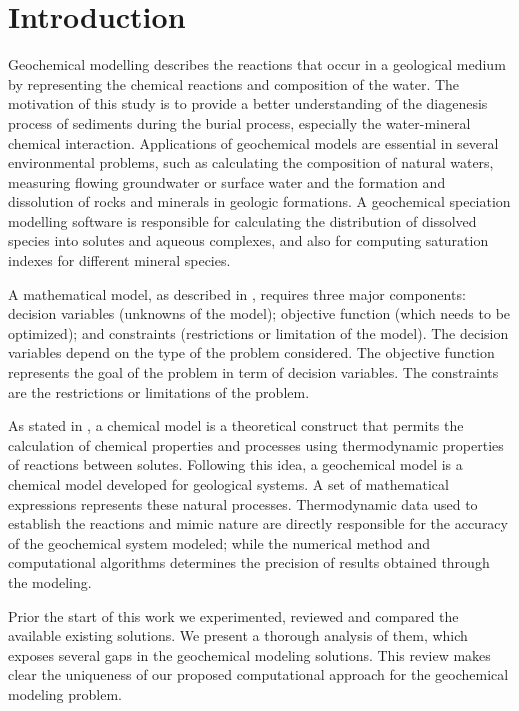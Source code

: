 \chapter{Introduction} 
\label{chapter:intro}


Geochemical modelling describes the reactions that occur in a geological medium by representing the chemical reactions and composition of the water. The motivation of this study is to provide a better understanding of the diagenesis process of sediments during the burial process, especially the water-mineral chemical interaction. Applications of geochemical models are essential in several environmental problems, such as calculating the composition of natural waters, measuring flowing groundwater or surface water and the formation and dissolution of rocks and minerals in geologic formations. A geochemical speciation modelling software is responsible for calculating the distribution of dissolved species into solutes and aqueous complexes, and also for computing saturation indexes for different mineral species. 


A mathematical model, as described in \cite{Sarker:08}, requires three major components: decision variables (unknowns of the model); objective function (which needs to be optimized); and constraints (restrictions or limitation of the model). 
The decision variables depend on the type of the problem considered.  The objective function represents the goal of the problem in term of decision variables. The constraints are the restrictions or limitations of the problem.

As stated in \cite{Drever:05}, a chemical model is a theoretical construct that permits the calculation of chemical properties and processes using thermodynamic properties of reactions between solutes. Following this idea, a geochemical model is a chemical model developed for geological systems. A set of mathematical expressions represents these natural processes. Thermodynamic data used to establish the reactions and mimic nature are directly responsible for the accuracy of the geochemical system modeled; while the numerical method and computational algorithms determines the precision of results obtained through the modeling.


Prior the start of this work we experimented, reviewed and compared the available existing solutions. We present a thorough analysis of them, which exposes several gaps in the geochemical modeling solutions. This review makes clear the uniqueness of our proposed computational approach for the geochemical modeling problem.

